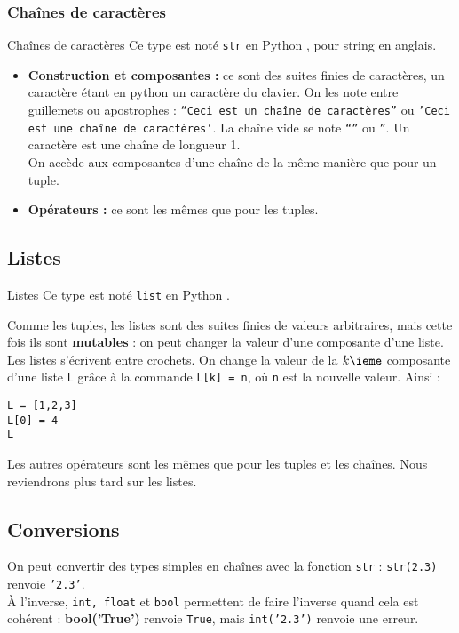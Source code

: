 \subsubsection{Chaînes de caractères}
\begin{defi}{Chaînes de caractères}
Ce type est noté \texttt{str} en Python , pour {string} en anglais.
\begin{itemize}
\item \textbf{Construction et composantes :} ce sont des suites finies de caractères, un caractère étant en python un caractère du clavier. On 
les note entre guillemets ou apostrophes : \texttt{``Ceci est un chaîne de caractères''} ou  
\texttt{'Ceci est une chaîne de caractères'}. La chaîne vide se note \texttt{``}\texttt{''} ou 
\texttt{''}. Un caractère est une chaîne de longueur 1.\\
On accède aux composantes d'une chaîne de la même manière que pour un tuple.
\item \textbf{Opérateurs :} ce sont les mêmes que pour les tuples.
\end{itemize}
\end{defi}
\subsection{Listes}
\begin{defi}{Listes}
Ce type est noté \texttt{list} en Python .

Comme les tuples, les {listes} sont des suites finies de valeurs arbitraires, mais cette fois 
ils sont \textbf{mutables} : on peut changer la valeur d'une composante d'une liste.\\
Les listes s'écrivent entre crochets. On change la valeur de la $k\ieme$ composante d'une liste 
\texttt{L} grâce à la commande \texttt{L[k] = n}, où \texttt{n} est la nouvelle valeur. Ainsi :
\begin{lstlisting}
L = [1,2,3] 
L[0] = 4  
L 
\end{lstlisting}

Les autres opérateurs sont les mêmes que pour les tuples et les chaînes. Nous reviendrons plus tard sur les listes.
\end{defi}

\subsection{Conversions}

On peut convertir des types simples en chaînes avec la fonction \texttt{str} : \texttt{str(2.3)} 
renvoie \texttt{'2.3'}.\\
À l'inverse, \texttt{int, float} et \texttt{bool} permettent de faire l'inverse quand cela est 
cohérent : \textbf{bool('True')} renvoie \texttt{True}, mais \texttt{int('2.3')} renvoie une 
erreur.\\

